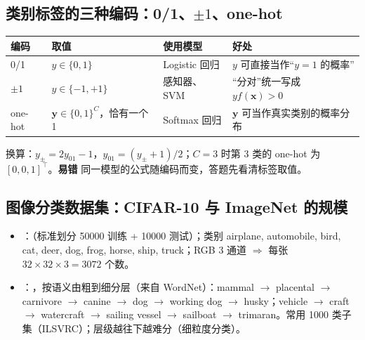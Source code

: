 \subsection{类别标签的三种编码：0/1、\texorpdfstring{$\pm1$}{±1}、one-hot}
\begin{center}\small
\begin{tabularx}{\linewidth}{@{}p{1.6cm}p{3.6cm}p{2.6cm}L@{}}
\toprule
编码 & 取值 & 使用模型 & 好处 \\
/1 & $y\in\{0,1\}$ & Logistic 回归 & $y$ 可直接当作“$y=1$ 的概率” \\
$\pm1$ & $y\in\{-1,+1\}$ & 感知器、SVM & “分对”统一写成 $y f(\bm x)>0$ \\
one-hot & $\bm y\in\{0,1\}^C$，恰有一个 1 & Softmax 回归 & $\bm y$ 可当作真实类别的概率分布 \\
\bottomrule
\end{tabularx}
\end{center}
换算：$y_{\pm}=2y_{01}-1$，$y_{01}=(y_{\pm}+1)/2$；$C=3$ 时第 3 类的 one-hot 为 $[0,0,1]^\top$。\textbf{易错} 同一模型的公式随编码而变，答题先看清标签取值。

\subsection{图像分类数据集：CIFAR-10 与 ImageNet 的规模}
\begin{itemize}
\item {}：（标准划分 50000 训练 + 10000 测试）；类别 airplane, automobile, bird, cat, deer, dog, frog, horse, ship, truck；RGB 3 通道 $\Rightarrow$ 每张 $32\times32\times3=3072$ 个数。
\item {}：，按语义由粗到细分层（来自 WordNet）：mammal $\to$ placental $\to$ carnivore $\to$ canine $\to$ dog $\to$ working dog $\to$ husky；vehicle $\to$ craft $\to$ watercraft $\to$ sailing vessel $\to$ sailboat $\to$ trimaran。常用 1000 类子集（ILSVRC）；层级越往下越难分（细粒度分类）。
\end{itemize}

